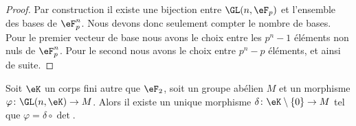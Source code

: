\begin{proof}
	Par construction il existe une bijection entre \( \GL(n,\eF_p)\) et l'ensemble des bases de \( \eF_p^n\). Nous devons donc seulement compter le nombre de bases. Pour le premier vecteur de base nous avons le choix entre les \( p^n-1\) éléments non nuls de \( \eF_p^n\). Pour le second nous avons le choix entre \( p^n-p\) éléments, et ainsi de suite.
\end{proof}

\begin{lemma}   \label{LemcDOTzM}
	Soit \( \eK\) un corps fini autre que \( \eF_2\), soit un groupe abélien \( M\) et un morphisme \( \varphi\colon \GL(n,\eK)\to M\). Alors il existe un unique morphisme \( \delta\colon \eK\setminus\{ 0 \}\to M\) tel que \( \varphi=\delta\circ\det\).
\end{lemma}

